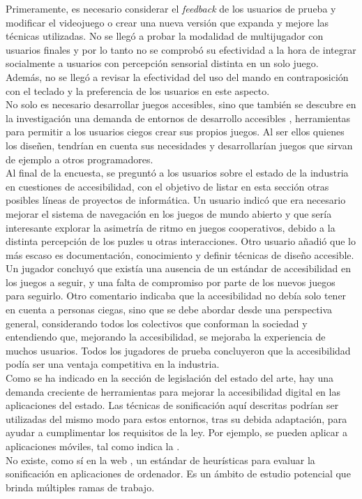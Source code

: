 Primeramente, es necesario considerar el \textit{feedback} de los usuarios de prueba y modificar el videojuego o crear una nueva versión que expanda y mejore las técnicas utilizadas. No se llegó a probar la modalidad de multijugador con usuarios finales y por lo tanto no se comprobó su efectividad a la hora de integrar socialmente a usuarios con percepción sensorial distinta en un solo juego. Además, no se llegó a revisar la efectividad del uso del mando en contraposición con el teclado y la preferencia de los usuarios en este aspecto.\\

No solo es necesario desarrollar juegos accesibles, sino que también se descubre en la investigación una demanda de entornos de desarrollo accesibles \cite{andradeIntroducingGamerInformationControl2020}, herramientas para permitir a los usuarios ciegos crear sus propios juegos. Al ser ellos quienes los diseñen, tendrían en cuenta sus necesidades y desarrollarían juegos que sirvan de ejemplo a otros programadores. \\

Al final de la encuesta, se preguntó a los usuarios sobre el estado de la industria en cuestiones de accesibilidad, con el objetivo de listar en esta sección otras posibles líneas de proyectos de informática. Un usuario indicó que era necesario mejorar el sistema de navegación en los juegos de mundo abierto y que sería interesante explorar la asimetría de ritmo en juegos cooperativos, debido a la distinta percepción de los puzles u otras interacciones. Otro usuario añadió que lo más escaso es documentación, conocimiento y definir técnicas de diseño accesible. \\

Un jugador concluyó que existía una ausencia de un estándar de accesibilidad en los juegos a seguir, y una falta de compromiso por parte de los nuevos juegos para seguirlo. Otro comentario indicaba que la accesibilidad no debía solo tener en cuenta a personas ciegas, sino que se debe abordar desde una perspectiva general, considerando todos los colectivos que conforman la sociedad y entendiendo que, mejorando la accesibilidad, se mejoraba la experiencia de muchos usuarios. Todos los jugadores de prueba concluyeron que la accesibilidad podía ser una ventaja competitiva en la industria. \\

Como se ha indicado en la sección de legislación del estado del arte, hay una demanda creciente de herramientas para mejorar la accesibilidad digital en las aplicaciones del estado. Las técnicas de sonificación aquí descritas podrían ser utilizadas del mismo modo para estos entornos, tras su debida adaptación, para ayudar a cumplimentar los requisitos de la ley. Por ejemplo, se pueden aplicar a aplicaciones móviles, tal como indica la . \cite{DirectiveEU20162016}\\

No existe, como sí en la web \cite{WebContentAccessibility}, un estándar de heurísticas para evaluar la sonificación en aplicaciones de ordenador. Es un ámbito de estudio potencial que brinda múltiples ramas de trabajo. \\

